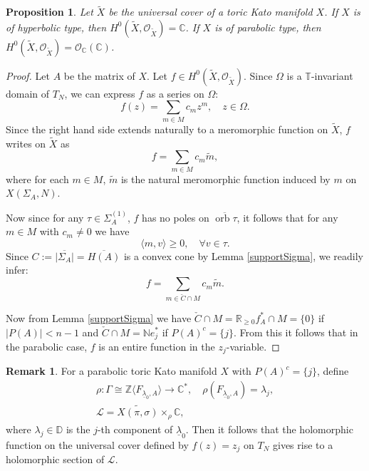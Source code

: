 \documentclass[JEP,XML,SOM,Unicode,NoFloatCountersInSection]{cedram}
\let\mathcal\mathscr
\newtheorem{proposition}[theorem]{Proposition}
\theoremstyle{definition}
\newtheorem{remark}[theorem]{Remark}
\let\wt\widetilde
\let\la\lambda
\let\ov\overline
\let\un\underline
\newcommand{\CC}{\mathbb{C}}
\newcommand{\DD}{\mathbb{D}}
\newcommand{\NN}{\mathbb{N}}
\newcommand{\RR}{\mathbb{R}}
\newcommand{\TT}{\mathbb{T}}
\newcommand{\ZZ}{\mathbb{Z}}
\newcommand{\Oo}{\mathcal{O}}
\DeclareMathOperator{\orb}{orb}
\begin{document}
\begin{proposition}\label{holoFcn}
Let $\wt{X}$ be the universal cover of a toric Kato manifold $X$.
If $X$ is of hyperbolic type, then $H^0(\wt{X},\mathcal O_{\wt{X}})=\CC$. If $X$ is of parabolic type, then $H^0(\wt{X},\mathcal O_{\wt{X}})=\Oo_\CC(\CC)$.
\end{proposition}
\begin{proof}
Let $A$ be the matrix of $X$. Let $f\in H^0(\wt{X},\mathcal O_{\wt{X}})$. Since $\Omega$ is a $\TT$-invariant domain of $T_N$, we can express $f$ as a series on $\Omega$:
\begin{equation*}
f(z)=\sum_{m\in M}c_m z^m, \quad z\in\Omega.
\end{equation*}
Since the right hand side extends naturally to a meromorphic function on $\wt{X}$, $f$ writes on $\wt{X}$ as
\begin{equation}
f=\sum_{m\in M} c_m\wt{m},
\end{equation}
where for each $m\in M$, $\wt{m}$ is the natural meromorphic function induced by $m$ on $X(\Sigma_A,N)$.

Now since for any $\tau\in\Sigma^{(1)}_A$, $f$ has no poles on $\ov{\orb\tau}$, it follows that for any $m\in M$ with $c_m\neq 0$ we have
\begin{equation*}
\langle m, v\rangle \geq 0, \quad \forall v\in\tau.
\end{equation*}
Since $C:=\ov{|\Sigma_A|}=\ov{H(A)}$ is a convex cone by Lemma \ref{supportSigma}, we readily infer:
\begin{equation*}
f=\sum_{m\in \check{C}\cap M}c_m\wt{m}.
\end{equation*}

Now from Lemma \ref{supportSigma} we have $\check C\cap M=\RR_{\geq 0}f_A^*\cap M=\{0\}$ if $|P(A)|<n-1$ and $\check C\cap M=\NN e_j^*$ if $P(A)^c=\{j\}$. From this it follows that in the parabolic case, $f$ is an entire function in the $z_j$-variable.
\end{proof}

\begin{remark}\label{sectionFlat}
For a parabolic toric Kato manifold $X$ with $P(A)^c=\{j\}$, define
\begin{gather}
\nonumber \rho:\Gamma\cong\ZZ\langle F_{\un\la_0,A}\rangle\to \CC^*,\quad \rho(F_{\un\la_0,A})=\la_j,\\
\mathcal L=\widetilde{X(\pi,\sigma)}\times_\rho \CC,
\end{gather}
where $\la_j\in\DD$ is the $j$-th component of $\un\la_0$. Then it follows that the holomorphic function on the universal cover defined by $f(z)=z_j$ on $T_N$ gives rise to a holomorphic section of $\mathcal L$.
\end{remark}
\end{document}
